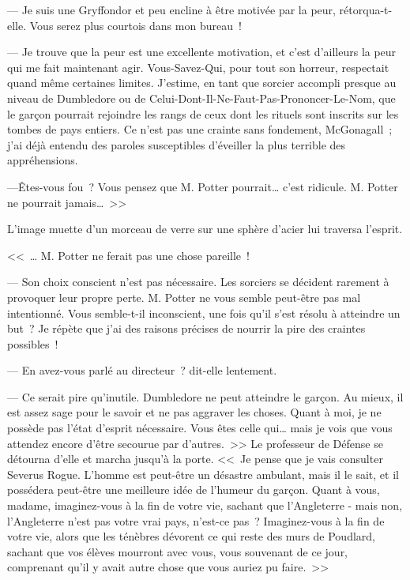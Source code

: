 --- Je suis une Gryffondor et peu encline à être motivée par la peur, rétorqua-t-elle. Vous serez plus courtois dans mon bureau~!

--- Je trouve que la peur est une excellente motivation, et c'est d'ailleurs la peur qui me fait maintenant agir. Vous-Savez-Qui, pour tout son horreur, respectait quand même certaines limites. J'estime, en tant que sorcier accompli presque au niveau de Dumbledore ou de Celui-Dont-Il-Ne-Faut-Pas-Prononcer-Le-Nom, que le garçon pourrait rejoindre les rangs de ceux dont les rituels sont inscrits sur les tombes de pays entiers. Ce n'est pas une crainte sans fondement, McGonagall~; j'ai déjà entendu des paroles susceptibles d'éveiller la plus terrible des appréhensions.

---Êtes-vous fou~? Vous pensez que M. Potter pourrait… c'est ridicule. M. Potter ne pourrait jamais…~>>

L'image muette d'un morceau de verre sur une sphère d'acier lui traversa l'esprit.

<<~… M. Potter ne ferait pas une chose pareille~!

--- Son choix conscient n'est pas nécessaire. Les sorciers se décident rarement à provoquer leur propre perte. M. Potter ne vous semble peut-être pas mal intentionné. Vous semble-t-il inconscient, une fois qu'il s'est résolu à atteindre un but~? Je répète que j'ai des raisons précises de nourrir la pire des craintes possibles~!

--- En avez-vous parlé au directeur~? dit-elle lentement.

--- Ce serait pire qu'inutile. Dumbledore ne peut atteindre le garçon. Au mieux, il est assez sage pour le savoir et ne pas aggraver les choses. Quant à moi, je ne possède pas l'état d'esprit nécessaire. Vous êtes celle qui… mais je vois que vous attendez encore d'être secourue par d'autres.~>> Le professeur de Défense se détourna d'elle et marcha jusqu'à la porte. <<~Je pense que je vais consulter Severus Rogue. L'homme est peut-être un désastre ambulant, mais il le sait, et il possédera peut-être une meilleure idée de l'humeur du garçon. Quant à vous, madame, imaginez-vous à la fin de votre vie, sachant que l'Angleterre - mais non, l'Angleterre n'est pas votre vrai pays, n'est-ce pas~? Imaginez-vous à la fin de votre vie, alors que les ténèbres dévorent ce qui reste des murs de Poudlard, sachant que vos élèves mourront avec vous, vous souvenant de ce jour, comprenant qu'il y avait autre chose que vous auriez pu faire.~>>
